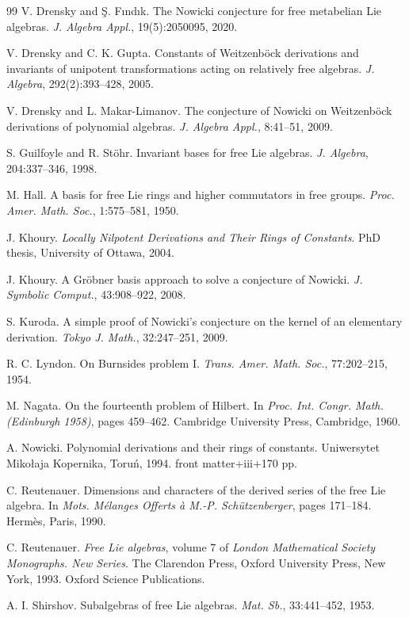 \documentclass{cimart}
\begin{document}
\begin{thebibliography}{99}
 V. Drensky and {\c S}. F{\i}nd{\i}k. The Nowicki conjecture for free metabelian Lie algebras. {\it J. Algebra Appl.}, 19(5):2050095, 2020.

 V. Drensky and C. K. Gupta. Constants of Weitzenb\"ock derivations and invariants of
unipotent transformations acting on relatively free algebras. {\it J. Algebra}, 292(2):393–428,
2005.

 V. Drensky and L. Makar-Limanov. The conjecture of Nowicki on Weitzenb\"ock derivations
of polynomial algebras. {\it J. Algebra Appl.}, 8:41–51, 2009.

 S. Guilfoyle and R. St\"ohr. Invariant bases for free Lie algebras. {\it J. Algebra}, 204:337–346,
1998.

 M. Hall. A basis for free Lie rings and higher commutators in free groups. {\it Proc. Amer.
Math. Soc.}, 1:575–581, 1950.

 J. Khoury. {\it Locally Nilpotent Derivations and Their Rings of Constants}. PhD thesis, University of Ottawa, 2004.

 J. Khoury. A Gr\"obner basis approach to solve a conjecture of Nowicki. {\it J. Symbolic Comput.}, 43:908–922, 2008.

 S. Kuroda. A simple proof of Nowicki’s conjecture on the kernel of an elementary derivation. {\it Tokyo J. Math.}, 32:247–251, 2009.

 R. C. Lyndon. On Burnsides problem I. {\it Trans. Amer. Math. Soc.}, 77:202–215, 1954.

 M. Nagata. On the fourteenth problem of Hilbert. In {\it Proc. Int. Congr. Math. (Edinburgh 1958)}, pages 459–462. Cambridge University Press, Cambridge, 1960.

 A. Nowicki. Polynomial derivations and their rings of constants. Uniwersytet Miko\l aja Kopernika, Toruń, 1994. front matter+iii+170 pp.

 C. Reutenauer. Dimensions and characters of the derived series of the free Lie algebra. In
{\it Mots. M\'elanges Offerts \`a M.-P. Sch\"utzenberger}, pages 171–184. Herm\`es, Paris, 1990.

 C. Reutenauer. {\it Free Lie algebras}, volume 7 of {\it London Mathematical Society Monographs. New Series}. The Clarendon Press, Oxford University Press, New York, 1993. Oxford Science Publications.

 A. I. Shirshov. Subalgebras of free Lie algebras. {\it Mat. Sb.}, 33:441–452, 1953.


\end{thebibliography}
\end{document}

